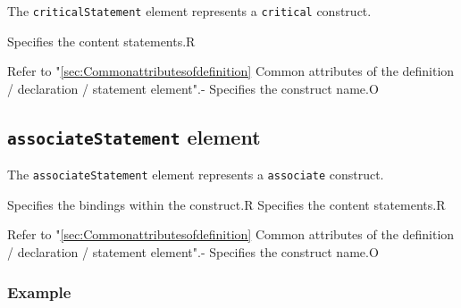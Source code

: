 The {\tt criticalStatement} element represents a {\tt critical} construct.


\begin{XcodeMLChildElements}
{Specifies the content statements.}{R}
\end{XcodeMLChildElements}

\begin{XcodeMLAttributes}
{Refer to "\ref{sec:Commonattributesofdefinition} Common attributes of the definition / declaration / statement element".}{-}
{Specifies the construct name.}{O}
\end{XcodeMLAttributes}


\subsection{ {\tt associateStatement} element}

The {\tt associateStatement} element represents a {\tt associate} construct.


\begin{XcodeMLChildElements}
{Specifies the bindings within the construct.}{R}
{Specifies the content statements.}{R}
\end{XcodeMLChildElements}

\begin{XcodeMLAttributes}
{Refer to "\ref{sec:Commonattributesofdefinition} Common attributes of the definition / declaration / statement element".}{-}
{Specifies the construct name.}{O}
\end{XcodeMLAttributes}

\subsubsection*{Example}


